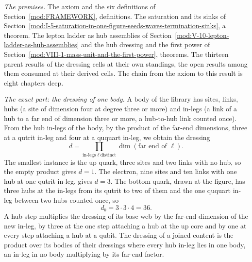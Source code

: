 \begin{chproof}
\textit{The premises.} The axiom and the six definitions of Section~\ref{mod:FRAMEWORK}, definitions. The saturation and its sinks of Section~\ref{mod:I-5-saturation-in-one-figure-seeds-waves-termination-sinks}, a theorem. The lepton ladder as hub assemblies of Section~\ref{mod:V-10-lepton-ladder-as-hub-assemblies} and the hub dressing and the first power of Section~\ref{mod:VIII-1-mass-unit-and-the-first-power}, theorems. The thirteen parent results of the dressing cells at their own standings, the open results among them consumed at their derived cells. The chain from the axiom to this result is eight chapters deep.

\textit{The exact part: the dressing of one body.} A body of the library has sites, links, hubs (a site of dimension four at degree three or more) and in-legs (a link of a hub to a far end of dimension three or more, a hub-to-hub link counted once). From the hub in-legs of the body, by the product of the far-end dimensions, three at a qutrit in-leg and four at a ququart in-leg, we obtain the dressing
\begin{equation}
d=\prod_{\text{in-legs }\ell\ \text{distinct}} \dim(\text{far end of }\ell) .
\end{equation}
The smallest instance is the up quark, three sites and two links with no hub, so the empty product gives $d=1$. The electron, nine sites and ten links with one hub at one qutrit in-leg, gives $d=3$. The bottom quark, drawn at the figure, has three hubs at the in-legs from its qutrit to two of them and the one ququart in-leg between two hubs counted once, so
\begin{equation}
d_{b}=3\cdot 3\cdot 4=36 .
\end{equation}
A hub step multiplies the dressing of its base web by the far-end dimension of the new in-leg, by three at the one step attaching a hub at the up core and by one at every step attaching a hub at a qubit. The dressing of a joined content is the product over its bodies of their dressings where every hub in-leg lies in one body, an in-leg in no body multiplying by its far-end factor.


\end{chproof}
